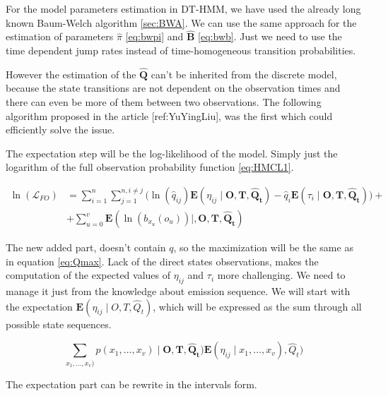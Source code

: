 \documentclass[thesis=M,english]{FITthesis}[2012/10/20]
\newcommand{\matr}[1]{\mathbf{#1}}
\begin{document}
For the model parameters estimation in DT-HMM, we have used the already long known Baum-Welch algorithm \ref{sec:BWA}. We can use the same approach for the estimation of parameters $\hat \pi$ \eqref{eq:bwpi} and $\matr{ \hat B }$ \eqref{eq:bwb}. Just we need to use the time dependent jump rates instead of time-homogeneous transition probabilities. %

However the estimation of the $\matr{ \hat Q }$ can't be inherited from the discrete model, because the state transitions are not dependent on the observation times and there can even be more of them between two observations. The following algorithm proposed in the article [ref:YuYingLiu], was the first which could efficiently solve the issue.        

The expectation step will be the log-likelihood of the model. Simply just the logarithm of the full observation probability function \eqref{eq:HMCL1}.

\begin{equation}\label{eq:EMCTHMM}
\begin{aligned}  
 \ln(\mathcal{L}_{FO}) &= \sum_{i=1}^{n} \sum_{j=1}^{n, i \neq j} \big( \ln( \hat q_{ij}) \mathbf{E}( \eta_{ij} \mid \matr{O},\matr{T}, \matr{ \hat Q_t } ) - \hat q_i \mathbf{E}( \tau_i \mid \matr{O},\matr{T}, \matr{ \hat Q_t } ) \big) + \\
    &+ \sum_{u=0}^v \mathbf{E}( \ln( b_{ x_u }(o_u) ) \mid, \matr{O},\matr{T},\matr{\hat Q_t} )
\end{aligned}
\end{equation}

The new added part, doesn't contain $q$, so the maximization will be the same as in equation \eqref{eq:Qmax}. Lack of the direct states observations, makes the computation of the expected values of $\eta_{ij}$ and $\tau_i$ more challenging. We need to manage it just from the knowledge about emission sequence. We will start with the expectation $\mathbf{E}(\eta_{ij} \mid O,T, \hat Q_t )$, which will be expressed as the sum through all possible state sequences.

\begin{equation} 
\sum_{x_1,\dots,x_v)} p(x_1,\dots,x_v) \mid \matr{O},\matr{T}, \matr{ \hat Q_t }) \mathbf{E}(\eta_{ij} \mid x_1,\dots,x_v) ,\hat Q_t )
\end{equation}

The expectation part can be rewrite in the intervals form.  
\end{document}
